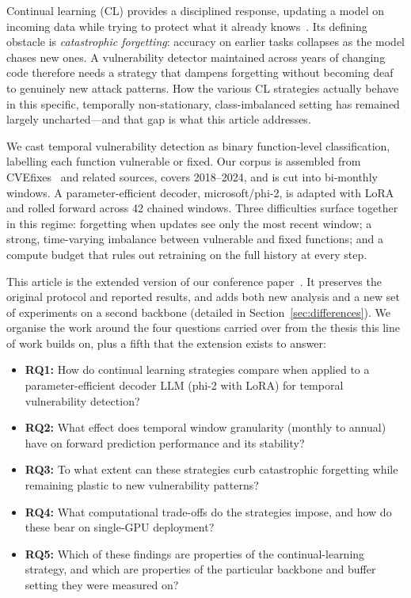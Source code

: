 \documentclass[a4paper,twoside]{article}
\begin{document}
Continual learning (CL) provides a disciplined response, updating a model on incoming data while trying to protect what it already knows~\citep{Wu2024CLSurvey}. Its defining obstacle is \emph{catastrophic forgetting}: accuracy on earlier tasks collapses as the model chases new ones. A vulnerability detector maintained across years of changing code therefore needs a strategy that dampens forgetting without becoming deaf to genuinely new attack patterns. How the various CL strategies actually behave in this specific, temporally non-stationary, class-imbalanced setting has remained largely uncharted---and that gap is what this article addresses.

We cast temporal vulnerability detection as binary function-level classification, labelling each function vulnerable or fixed. Our corpus is assembled from CVEfixes~\citep{Bhandari2021CVEfixes} and related sources, covers 2018--2024, and is cut into bi-monthly windows. A parameter-efficient decoder, microsoft/phi-2, is adapted with LoRA~\citep{Hu2021LoRA} and rolled forward across 42 chained windows. Three difficulties surface together in this regime: forgetting when updates see only the most recent window; a strong, time-varying imbalance between vulnerable and fixed functions; and a compute budget that rules out retraining on the full history at every step.

This article is the extended version of our conference paper~\citep{Dou2026ICISSP}. It preserves the original protocol and reported results, and adds both new analysis and a new set of experiments on a second backbone (detailed in Section~\ref{sec:differences}). We organise the work around the four questions carried over from the thesis this line of work builds on, plus a fifth that the extension exists to answer:
\begin{itemize}
    \item \textbf{RQ1:} How do continual learning strategies compare when applied to a parameter-efficient decoder LLM (phi-2 with LoRA) for temporal vulnerability detection?
    \item \textbf{RQ2:} What effect does temporal window granularity (monthly to annual) have on forward prediction performance and its stability?
    \item \textbf{RQ3:} To what extent can these strategies curb catastrophic forgetting while remaining plastic to new vulnerability patterns?
    \item \textbf{RQ4:} What computational trade-offs do the strategies impose, and how do these bear on single-GPU deployment?
    \item \textbf{RQ5:} Which of these findings are properties of the continual-learning strategy, and which are properties of the particular backbone and buffer setting they were measured on?
\end{itemize}
\end{document}
